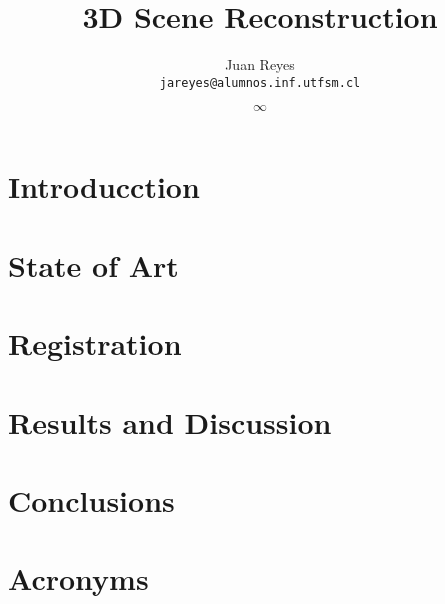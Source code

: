 \documentclass[spanish,english,12pt,letterpaper,oneside]{book}
\title{3D Scene Reconstruction}
\author{
  Juan Reyes \\ \texttt{jareyes@alumnos.inf.utfsm.cl}
}
\date{$\infty$}
\begin{document}
\frontmatter




\tableofcontents

{}
\listoffigures
{}
\listoftables

\mainmatter

\chapter{Introducction}
\label{introduccion}


\chapter{State of Art}


\chapter{Registration}




\chapter{Results and Discussion}
%


\chapter{Conclusions}
\label{conclusions}


\appendix



\chapter{Acronyms}
\label{acronyms}





\backmatter



\end{document}
